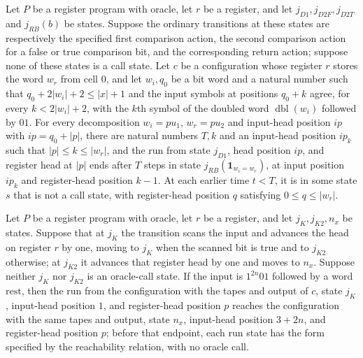 \begin{lemma}
\label{Complexity.LogProg.cmpDbl_run}
\leanok
{}
Let $P$ be a register program with oracle, let $r$ be a register, and let
$j_{D1},j_{D2F},j_{D2T}$ and $j_{RB}(b)$ be states. Suppose the ordinary transitions at
these states are respectively the specified first comparison action, the second
comparison action for a false or true comparison bit, and the corresponding return
action; suppose none of these states is a call state. Let $c$ be a configuration whose
register $r$ stores the word $w_r$ from cell $0$, and let $w_i,q_0$ be a bit word and a
natural number such that $q_0+2|w_i|+2\le |x|+1$ and the input symbols at positions
$q_0+k$ agree, for every $k<2|w_i|+2$, with the $k$th symbol of the doubled word
$\operatorname{dbl}(w_i)$ followed by $01$. For every decomposition $w_i=p u_1$, $w_r=p
u_2$ and input-head position $ip$ with $ip=q_0+|p|$, there are natural numbers $T,k$ and
an input-head position $ip_k$ such that $|p|\le k\le |w_r|$, and the run from state
$j_{D1}$, head position $ip$, and register head at $|p|$ ends after $T$ steps in state
$j_{RB}(\mathbf 1_{w_i=w_r})$, at input position $ip_k$ and register-head position
$k-1$. At each earlier time $t<T$, it is in some state $s$ that is not a call state,
with register-head position $q$ satisfying $0\le q\le |w_r|$.
\end{lemma}

\begin{lemma}
\label{Complexity.LogProg.skipPrefix_run}
\leanok
{}
Let $P$ be a register program with oracle, let $r$ be a register, and let
$j_K,j_{K2},n_x$ be states. Suppose that at $j_K$ the transition scans the input and
advances the head on register $r$ by one, moving to $j_K$ when the scanned bit is true
and to $j_{K2}$ otherwise; at $j_{K2}$ it advances that register head by one and moves
to $n_x$. Suppose neither $j_K$ nor $j_{K2}$ is an oracle-call state. If the input is
$1^{2n}01$ followed by a word $\mathrm{rest}$, then the run from the configuration with
the tapes and output of $c$, state $j_K$, input-head position $1$, and register-head
position $p$ reaches the configuration with the same tapes and output, state $n_x$,
input-head position $3+2n$, and register-head position $p$; before that endpoint, each
run state has the form specified by the reachability relation, with no oracle call.
\end{lemma}

